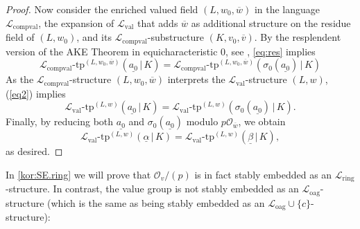 \documentclass[a4paper]{amsart}
\theoremstyle{mystyle2}
\theoremstyle{mystyle}
\renewcommand{\vec}[1]{\underline{#1}}
\renewcommand{\L}{\mathcal{L}}
\newcommand{\Lring}{\L_{\mathrm{ring}}}
\newcommand{\Loag}{\L_{\mathrm{oag}}}
\newcommand{\Lval}{\L_{\mathrm{val}}}
\newcommand{\Ltval}{\L_{\mathrm{compval}}}
\renewcommand{\O}{\mathcal{O}}
\numberwithin{equation}{section}
\begin{document}
\begin{proof}
        Now consider the enriched valued field $(L,w_0, \overline{w})$ in the language $\Ltval$, the expansion of $\Lval$ that adds $\overline{w}$ as additional structure on the residue field of $(L,w_0)$, and its $\Ltval$-substructure $(K,v_0,\overline{v})$. By the 
        resplendent version of the AKE Theorem in equicharacteristic $0$, see 
        \cite[Section 7.2]{vdd}, \eqref{eq:res} implies 
        \begin{equation}
        {\Ltval}\textrm{-}\mathrm{tp}^{(L,w_0,\overline{w})}(\vec{a_0}\,|\,K) = \Ltval\textrm{-}\mathrm{tp}^{(L,w_0,\overline{w})}(\sigma_0(\vec{a_0})\,|\,K) \label{eq2}
        \end{equation}
        As the $\Ltval$-structure $(L,w_0,\overline{w})$ interprets the $\Lval$-structure
        $(L,w)$, (\ref{eq2}) implies 
        \begin{equation}
        {\Lval}\textrm{-}\mathrm{tp}^{(L,w)}(\vec{a_0}\,|\,K) = \Lval\textrm{-}\mathrm{tp}^{(L,w)}(\sigma_0(\vec{a_0})\,|\,K).
        \end{equation}
        Finally, by reducing both $\vec{a_0}$ and $\sigma_0(\vec{a_0})$ modulo $p\O_{\overline{w}}$, we obtain 
        \begin{equation}
        {\Lval}\textrm{-}\mathrm{tp}^{(L,w)}(\vec{\alpha}\,|\,K) = \Lval\textrm{-}\mathrm{tp}^{(L,w)}(\vec{\beta} \,|\,K),
        \end{equation}
        as desired.
    \end{proof}

    In \cref{kor:SE.ring} we will prove that $\O_v/(p)$ is in fact stably embedded as an $\Lring$-structure.
    In contrast, the value group is not stably embedded as an $\Loag$-structure
    (which is the same as being stably embedded as an $\Loag \cup \{c\}$-structure): 
\end{document}
